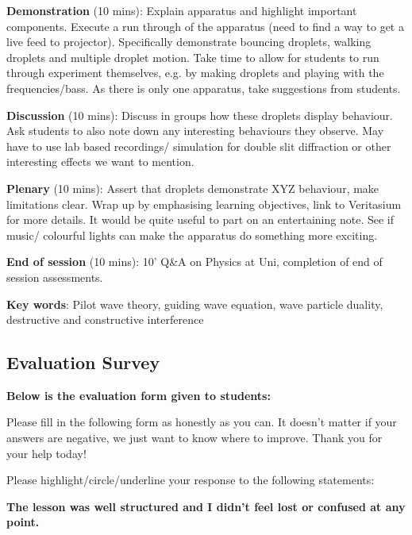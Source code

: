 \noindent \textbf{Demonstration} (10 mins): Explain apparatus and highlight important components. Execute a run through of the apparatus (need to find a way to get a live feed to projector). Specifically demonstrate bouncing droplets, walking droplets and multiple droplet motion. Take time to allow for students to run through experiment themselves, e.g. by making droplets and playing with the frequencies/bass. As there is only one apparatus, take suggestions from students. 

\noindent \textbf{Discussion} (10 mins): Discuss in groups how these droplets display behaviour. Ask students to also note down any interesting behaviours they observe. May have to use lab based recordings/ simulation for double slit diffraction or other interesting effects we want to mention.

\noindent \textbf{Plenary} (10 mins): Assert that droplets demonstrate XYZ behaviour, make limitations clear. Wrap up by emphasising learning objectives, link to Veritasium for more details. It would be quite useful to part on an entertaining note. See if music/ colourful lights can make the apparatus do something more exciting. 

\noindent \textbf{End of session} (10 mins): 10' Q\&A on Physics at Uni, completion of end of session assessments. 



\noindent \textbf{Key words}: Pilot wave theory, guiding wave equation, wave particle duality, destructive and constructive interference

\clearpage

\subsection{Evaluation Survey} \label{evaluationsurvey}
\noindent \textbf{Below is the evaluation form given to students:}
\vspace{3mm}

\noindent Please fill in the following form as honestly as you can. It doesn't matter if your answers are negative, we just want to know where to improve. Thank you for your help today!

Please highlight/circle/underline your response to the following statements:

\vspace{3mm}

\noindent \textbf{The lesson was well structured and I didn't feel lost or confused at any point.}

